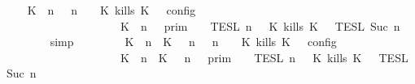 \begin{isabellebody}
\ \isamarkupfalse%
\ {\isacartoucheopen}{\isasymlbrakk}\ {\isacharparenleft}{\isacharparenleft}K\ {\isasymnot}{\isasymUp}\ n{\isacharparenright}\ {\isacharhash}\ {\isasymGamma}{\isacharparenright}{\isacharcomma}\ n\ {\isasymturnstile}\ {\isasymPsi}\ {\isasymtriangleright}\ {\isacharparenleft}{\isacharparenleft}K\ kills\ K\ {\isacharhash}\ {\isasymPhi}{\isacharparenright}\ {\isasymrbrakk}\isactrlsub c\isactrlsub o\isactrlsub n\isactrlsub f\isactrlsub i\isactrlsub g\isanewline
\ \ \ \ \ \ \ \ \ \ \ \ \ \ \ \ \ \ {\isacharequal}\ {\isasymlbrakk}{\isasymlbrakk}\ {\isacharparenleft}K\ {\isasymnot}{\isasymUp}\ n{\isacharparenright}\ {\isacharhash}\ {\isasymGamma}\ {\isasymrbrakk}{\isasymrbrakk}\isactrlsub p\isactrlsub r\isactrlsub i\isactrlsub m\ {\isasyminter}\ {\isasymlbrakk}{\isasymlbrakk}\ {\isasymPsi}\ {\isasymrbrakk}{\isasymrbrakk}\isactrlsub T\isactrlsub E\isactrlsub S\isactrlsub L\isactrlbsup {\isasymge}\ n\isactrlesup \ {\isasyminter}\ {\isasymlbrakk}{\isasymlbrakk}\ {\isacharparenleft}K\ kills\ K\ {\isacharhash}\ {\isasymPhi}\ {\isasymrbrakk}{\isasymrbrakk}\isactrlsub T\isactrlsub E\isactrlsub S\isactrlsub L\isactrlbsup {\isasymge}\ Suc\ n\isactrlesup {\isacartoucheclose}\isanewline
\ \ \ \ \ \ \isamarkupfalse%
\ simp\isanewline
\ \ \ \ \isamarkupfalse%
\ \isamarkupfalse%
\ {\isacartoucheopen}{\isasymlbrakk}\ {\isacharparenleft}{\isacharparenleft}K\ {\isasymUp}\ n{\isacharparenright}\ {\isacharhash}\ {\isacharparenleft}K\ {\isasymnot}{\isasymUp}\ {\isasymge}\ n{\isacharparenright}\ {\isacharhash}\ {\isasymGamma}{\isacharparenright}{\isacharcomma}\ n\ {\isasymturnstile}\ {\isasymPsi}\ {\isasymtriangleright}\ {\isacharparenleft}{\isacharparenleft}K\ kills\ K\ {\isacharhash}\ {\isasymPhi}{\isacharparenright}\ {\isasymrbrakk}\isactrlsub c\isactrlsub o\isactrlsub n\isactrlsub f\isactrlsub i\isactrlsub g\isanewline
\ \ \ \ \ \ \ \ \ \ \ \ \ \ \ \ \ \ {\isacharequal}\ {\isasymlbrakk}{\isasymlbrakk}\ {\isacharparenleft}K\ {\isasymUp}\ n{\isacharparenright}\ {\isacharhash}\ {\isacharparenleft}K\ {\isasymnot}{\isasymUp}\ {\isasymge}\ n{\isacharparenright}\ {\isacharhash}\ {\isasymGamma}\ {\isasymrbrakk}{\isasymrbrakk}\isactrlsub p\isactrlsub r\isactrlsub i\isactrlsub m\ {\isasyminter}\ {\isasymlbrakk}{\isasymlbrakk}\ {\isasymPsi}\ {\isasymrbrakk}{\isasymrbrakk}\isactrlsub T\isactrlsub E\isactrlsub S\isactrlsub L\isactrlbsup {\isasymge}\ n\isactrlesup \ {\isasyminter}\ {\isasymlbrakk}{\isasymlbrakk}\ {\isacharparenleft}K\ kills\ K\ {\isacharhash}\ {\isasymPhi}\ {\isasymrbrakk}{\isasymrbrakk}\isactrlsub T\isactrlsub E\isactrlsub S\isactrlsub L\isactrlbsup {\isasymge}\ Suc\ n\isactrlesup {\isacartoucheclose}\isanewline

\end{isabellebody}
